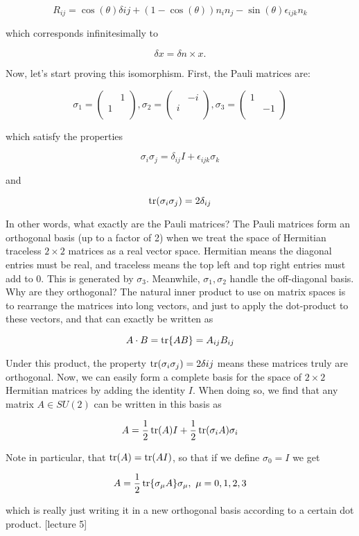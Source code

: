 \documentclass{article}
\theoremstyle{definition}
\begin{document}
$$ R_{ij} = \cos(\theta) \delta{ij} + (1 - \cos(\theta)) n_i n_j - \sin(\theta)
\epsilon_{ijk} n_k $$

which corresponds infinitesimally to

$$ \delta x = \delta n \times x. $$

Now, let's start proving this isomorphism. First, the Pauli matrices are:

$$
\sigma_1 =
\begin{pmatrix}
  & 1 \\
  1 & \\
\end{pmatrix},
\sigma_2 =
\begin{pmatrix}
  & -i \\
  i & \\
\end{pmatrix},
\sigma_3 =
\begin{pmatrix}
  1 & \\
  & -1 \\
\end{pmatrix}
$$

which satisfy the properties

$$ \sigma_i \sigma_j = \delta_{ij}I + \epsilon_{ijk} \sigma_k $$

and

$$ \tr(\sigma_i \sigma_j) = 2 \delta_{ij} $$

In other words, what exactly are the Pauli matrices? The Pauli matrices form an
orthogonal basis (up to a factor of 2) when we treat the space of Hermitian traceless
$2\times 2$ matrices as a real vector space. Hermitian means the diagonal
entries must be real, and traceless means the top left and top right entries
must add to 0. This is generated by $\sigma_3$. Meanwhile, $\sigma_1, \sigma_2$
handle the off-diagonal basis. Why are they orthogonal? The natural inner
product to use on matrix spaces is to rearrange the matrices into long vectors,
and just to apply the dot-product to these vectors, and that can exactly be
written as

$$ A \cdot B = \tr{AB} = A_{ij} B_{ij} $$

Under this product, the property $ \tr(\sigma_i \sigma_j) = 2 \delta{ij}$ means
these matrices truly are orthogonal. Now, we can easily form a complete basis
for the space of $2 \times 2$ Hermitian matrices by adding the identity $I$.
When doing so, we find that any matrix $A \in SU(2)$ can be written in this
basis as

$$ A = \frac{1}{2} \tr(A) I + \frac{1}{2} \tr(\sigma_i A) \sigma_i $$

Note in particular, that $\tr(A) = \tr(AI)$, so that if we define $\sigma_0 = I$
we get

$$ A = \frac{1}{2} \tr{\sigma_\mu A} \sigma_\mu, \,\, \mu = 0, 1, 2, 3 $$

which is really just writing it in a new orthogonal basis according to a certain
dot product. [lecture 5]
\end{document}

